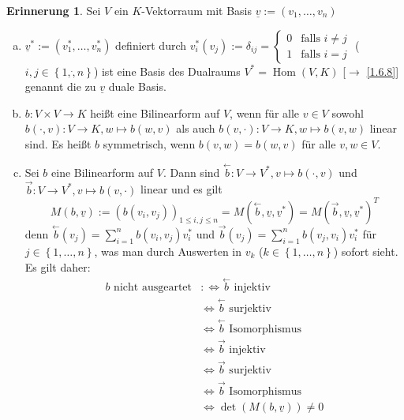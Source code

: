 \documentclass[
twoside=semi,
fontsize=12,
DIV=12, 
cleardoublepage=current,
leqno,
headings=optiontoheadandtoc, 
toc=idx
]{scrbook}
\newcommand{\set}[1]{\left\{ #1 \right\}}
\DeclareMathOperator{\Hom}{Hom}
\theoremstyle{definition}
\newtheorem{erinnerung}[definition]{Erinnerung}
\begin{document}
	\begin{erinnerung}\label{2.4.16}
		Sei $V$ ein $K$-Vektorraum mit Basis $\underline{v} := (v_1, \dots, v_n)$
		\begin{enumerate}[(a)]
			\item 
			$\underline{v}^* := (v_1^*, \dots, v_n^*)$ definiert durch $v_i^*(v_j) := \delta_{ij} = \begin{cases}
				0 & \textrm{falls } i \neq j\\
				1 & \textrm{falls } i = j
			\end{cases}$
			($i, j \in \set{1, \dot, n}$) ist eine Basis des Dualraums $V^* = \Hom(V, K)$ [$\to$ \ref{1.6.8}] genannt die zu $\underline{v}$ duale Basis.
			
			\item $b:V \times V \to K$ hei\ss t eine Bilinearform auf $V$, wenn f\"ur alle $v \in V$ sowohl $b(\cdot, v) : V \to K, w \mapsto b(w,v)$ als auch 
			$b(v, \cdot): V \to K, w \mapsto b(v,w)$ linear sind. Es hei\ss t $b$ symmetrisch, wenn $b(v, w) = b(w,v)$ f\"ur alle $v,w \in V$.
			
			\item Sei $b$ eine Bilinearform auf $V$. Dann sind 
			$\overset{\leftarrow}{b}: V \to V^*, v \mapsto b(\cdot, v)$ und 
			$\overset{\rightarrow}{b}: V \to V^*, v \mapsto b(v, \cdot)$ linear und es gilt 
			\[M(b,\underline{v}) := (b(v_i, v_j))_{1 \leq i,j \leq n} = M(\overset{\leftarrow}{b}, \underline{v}, \underline{v}^*) = M(\overset{\rightarrow}{b}, \underline{v}, \underline{v}^*)^T\]
			denn $\overset{\leftarrow}{b}(v_j) = \sum_{i=1}^n b(v_i, v_j)v_i^*$ und $\overset{\rightarrow}{b}(v_j) = \sum_{i=1}^n b(v_j, v_i)v_i^*$ f\"ur $j \in \set{1, \dots, n}$,
			was man durch Auswerten in $v_k$ ($k \in \set{1, \dots, n}$) sofort sieht. Es gilt daher:
			\begin{align*}
				b \textrm{ nicht ausgeartet} &:\Leftrightarrow \overset{\leftarrow}{b} \textrm{ injektiv}\\
				&\Leftrightarrow \overset{\leftarrow}{b} \textrm{ surjektiv}\\
				&\Leftrightarrow \overset{\leftarrow}{b} \textrm{ Isomorphismus}\\
				&\Leftrightarrow \overset{\rightarrow}{b} \textrm{ injektiv}\\
				&\Leftrightarrow \overset{\rightarrow}{b} \textrm{ surjektiv}\\
				&\Leftrightarrow \overset{\rightarrow}{b} \textrm{ Isomorphismus}\\
				&\Leftrightarrow \det(M(b, \underline{v})) \neq 0
			\end{align*}
		

\end{enumerate}
\end{erinnerung}
\end{document}
